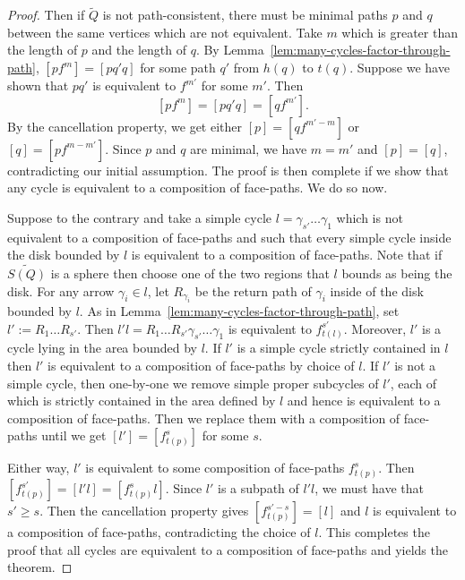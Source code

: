 \documentclass{article}
\theoremstyle{definition}
\begin{document}
\begin{proof}
	Then if ${\widetilde Q}$ is not path-consistent, there must be minimal paths $p$ and $q$ between the same vertices which are not equivalent. Take $m$ which is greater than the length of $p$ and the length of $q$. 
		By Lemma~\ref{lem:many-cycles-factor-through-path}, $[pf^m]=[pq'q]$ for some path $q'$ from $h(q)$ to $t(q)$. Suppose we have shown that $pq'$ is equivalent to $f^{m'}$ for some $m'$. Then 
				\[[pf^m]=[pq'q]=[qf^{m'}].\]
			By the cancellation property, we get either $[p]=[qf^{m'-m}]$ or $[q]=[pf^{m-m'}]$. 
			Since $p$ and $q$ are minimal, we have $m=m'$ and $[p]=[q]$, contradicting our initial assumption. The proof is then complete if we show that any cycle is equivalent to a composition of face-paths. We do so now.

			Suppose to the contrary and take a simple cycle $l=\gamma_{s'}\dots\gamma_1$ which is not equivalent to a composition of face-paths and such that every simple cycle inside the disk bounded by $l$ is equivalent to a composition of face-paths.  Note that if   $\widetilde{S(Q)}$ is a sphere then choose one of the two regions that $l$ bounds as being the disk. 
			For any arrow $\gamma_i\in l$, let $R_{\gamma_i}$ be the return path of $\gamma_i$ inside of the disk bounded by $l$. 
				As in Lemma~\ref{lem:many-cycles-factor-through-path}, set $l':=R_1\dots R_{s'}$. Then $l'l=R_1\dots R_{s'}\gamma_{{s'}}\dots\gamma_1$ is equivalent to $f_{t(l)}^{s'}$. Moreover, $l'$ is a cycle lying in the area bounded by $l$.
			If $l'$ is a simple cycle strictly contained in $l$ then $l'$ is equivalent to a composition of face-paths by choice of $l$. If $l'$ is not a simple cycle, then one-by-one we remove simple proper subcycles of $l'$, each of which is strictly contained in the area defined by $l$ and hence is equivalent to a composition of face-paths. Then we replace them with a composition of face-paths until 
			we get $[l']=[f_{t(p)}^{s}]$ for some $s$.

			Either way, $l'$ is equivalent to some composition of face-paths $f_{t(p)}^s$. Then $[f_{t(p)}^{s'}]=[l'l]=[f_{t(p)}^sl]$. Since $l'$ is a subpath of $l'l$, we must have that ${s'}\geq s$. Then the cancellation property gives $[f_{t(p)}^{{s'}-s}]=[l]$ and $l$ is equivalent to a composition of face-paths, contradicting the choice of $l$. This completes the proof that all cycles are equivalent to a composition of face-paths and yields the theorem.
\end{proof}

    
\end{document}
